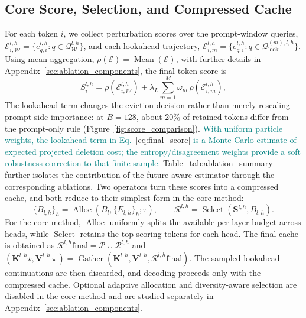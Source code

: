 \documentclass{article} %
\begin{document}
\subsection{Core Score, Selection, and Compressed Cache}
\label{subsec:core_score}
For each token $i$, we collect perturbation scores over the prompt-window queries, $\mathcal{E}^{l,h}_{i,\mathcal{W}} =\{e^{l,h}_{q,i}:q\in\mathcal{Q}^{l,h}_{\mathcal{W}}\}$, and each lookahead trajectory, $\mathcal{E}^{l,h}_{i,m} =\{e^{l,h}_{q,i}:q\in\mathcal{Q}^{(m),l,h}_{\mathrm{look}}\}$. Using mean aggregation, $\rho(\mathcal{E})=\operatorname{Mean}(\mathcal{E})$, with further details in Appendix~\ref{sec:ablation_components}, the final token score is
\begin{equation}
S^{l,h}_{i}
=\rho(\mathcal{E}^{l,h}_{i,\mathcal{W}})
+\lambda_L\sum_{m=1}^{M}\omega_m\,\rho(\mathcal{E}^{l,h}_{i,m}),
\label{eq:final_score}
\end{equation}
The lookahead term changes the eviction decision rather than merely rescaling prompt-side importance: at $B=128$, about 20\% of retained tokens differ from the prompt-only rule (Figure~\ref{fig:score_comparison}). \textcolor{teal}{With uniform particle weights, the lookahead term in Eq.~\ref{eq:final_score} is a Monte-Carlo estimate of expected projected deletion cost; the entropy/disagreement weights provide a soft robustness correction to that finite sample.} Table~\ref{tab:ablation_summary} further isolates the contribution of the future-aware estimator through the corresponding ablations. Two operators turn these scores into a compressed cache, and both reduce to their simplest form in the core method:
\begin{equation}
\{B_{l,h}\}_{h}=\operatorname{Alloc}\!\left(B_l,\{E_{l,h}\}_{h};\tau\right),
\qquad
\mathcal{R}^{l,h}=\operatorname{Select}\!\left(\mathbf{S}^{l,h},B_{l,h}\right).
\label{eq:alloc_select}
\end{equation}
For the core method, $\operatorname{Alloc}$ uniformly splits the available per-layer budget across heads, while $\operatorname{Select}$ retains the top-scoring tokens for each head. The final cache is obtained as $\mathcal{R}^{l,h}{\mathrm{final}}=\mathcal{P}\cup\mathcal{R}^{l,h}$ and $(\mathbf{K}^{l,h}{\star},\mathbf{V}^{l,h}{\star})=\operatorname{Gather}(\mathbf{K}^{l,h},\mathbf{V}^{l,h},\mathcal{R}^{l,h}{\mathrm{final}})$. The sampled lookahead continuations are then discarded, and decoding proceeds only with the compressed cache. Optional adaptive allocation and diversity-aware selection are disabled in the core method and are studied separately in Appendix~\ref{sec:ablation_components}.
\end{document}
